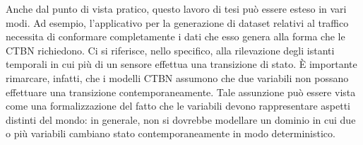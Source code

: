 Anche dal punto di vista pratico, questo lavoro di tesi può essere esteso in vari modi. Ad esempio, l'applicativo per la generazione di dataset relativi al traffico necessita di conformare completamente i dati che esso genera alla forma che le \acs{CTBN} richiedono. Ci si riferisce, nello specifico, alla rilevazione degli istanti temporali in cui più di un sensore effettua una transizione di stato. \`E importante rimarcare, infatti, che i modelli \acs{CTBN} assumono che due variabili non possano effettuare una transizione contemporaneamente. Tale assunzione può essere vista come una formalizzazione del fatto che le variabili devono rappresentare aspetti distinti del mondo: in generale, non si dovrebbe modellare un dominio in cui due o più variabili cambiano stato contemporaneamente in modo deterministico.
